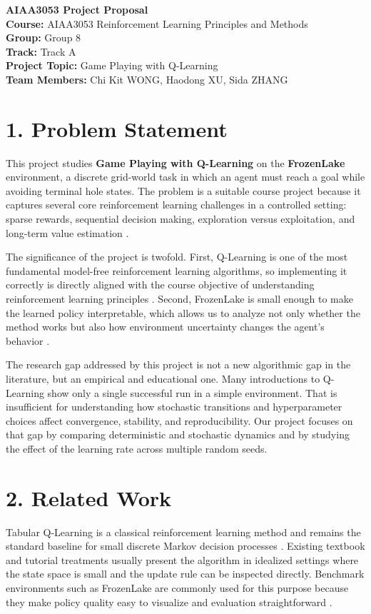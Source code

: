 \documentclass[11pt]{article}
\begin{document}
\begin{center}
{\Large \textbf{AIAA3053 Project Proposal}}\\[0.6em]
\textbf{Course:} AIAA3053 Reinforcement Learning Principles and Methods\\
\textbf{Group:} Group 8\\
\textbf{Track:} Track A\\
\textbf{Project Topic:} Game Playing with Q-Learning\\
\textbf{Team Members:} Chi Kit WONG, Haodong XU, Sida ZHANG
\end{center}

\section*{1. Problem Statement}
This project studies \textbf{Game Playing with Q-Learning} on the \textbf{FrozenLake} environment, a discrete grid-world task in which an agent must reach a goal while avoiding terminal hole states. The problem is a suitable course project because it captures several core reinforcement learning challenges in a controlled setting: sparse rewards, sequential decision making, exploration versus exploitation, and long-term value estimation \cite{SuttonBarto2018}.

The significance of the project is twofold. First, Q-Learning is one of the most fundamental model-free reinforcement learning algorithms, so implementing it correctly is directly aligned with the course objective of understanding reinforcement learning principles \cite{WatkinsDayan1992}. Second, FrozenLake is small enough to make the learned policy interpretable, which allows us to analyze not only whether the method works but also how environment uncertainty changes the agent's behavior \cite{GymnasiumDocs}.

The research gap addressed by this project is not a new algorithmic gap in the literature, but an empirical and educational one. Many introductions to Q-Learning show only a single successful run in a simple environment. That is insufficient for understanding how stochastic transitions and hyperparameter choices affect convergence, stability, and reproducibility. Our project focuses on that gap by comparing deterministic and stochastic dynamics and by studying the effect of the learning rate across multiple random seeds.

\section*{2. Related Work}
Tabular Q-Learning is a classical reinforcement learning method and remains the standard baseline for small discrete Markov decision processes \cite{WatkinsDayan1992,SuttonBarto2018}. Existing textbook and tutorial treatments usually present the algorithm in idealized settings where the state space is small and the update rule can be inspected directly. Benchmark environments such as FrozenLake are commonly used for this purpose because they make policy quality easy to visualize and evaluation straightforward \cite{GymnasiumDocs}.
\end{document}
